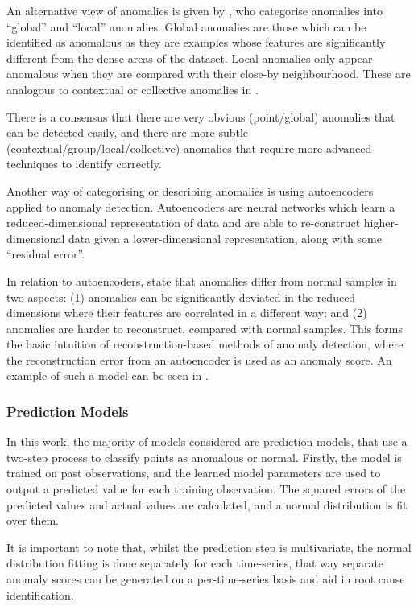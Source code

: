 \documentclass{mpaper}
\begin{document}
An alternative view of anomalies is given by \cite{comparativeUnsupervisedEvaluation}, who categorise anomalies into ``global'' and ``local'' anomalies. Global anomalies are those which can be identified as anomalous as they are examples whose features are significantly different from the dense areas of the dataset.
Local anomalies only appear anomalous when they are compared with their close-by neighbourhood. These are analogous to contextual or collective anomalies in \cite{deepLearningSurvey}.

There is a consensus that there are very obvious (point/global) anomalies that can be detected easily, and there are more subtle (contextual/group/local/collective) anomalies that require more advanced techniques to identify correctly.

Another way of categorising or describing anomalies is using autoencoders applied to anomaly detection. Autoencoders are neural networks which learn a reduced-dimensional representation of data and are able to re-construct higher-dimensional data given a lower-dimensional representation, along with some ``residual error''.

In relation to autoencoders, \cite{DAGMM} state that anomalies differ from normal samples in two aspects: (1) anomalies can be significantly deviated in the reduced dimensions where their features are correlated in a different way; and (2) anomalies are harder to reconstruct, compared with normal samples. This forms the basic intuition of reconstruction-based methods of anomaly detection, where the reconstruction error from an autoencoder is used as an anomaly score. An example of such a model can be seen in \cite{lstmEncoderDecorder}.

\subsubsection{Prediction Models}
\label{section:prediction-models}

In this work, the majority of models considered are prediction models, that use a two-step process to classify points as anomalous or normal. Firstly, the model is trained on past observations, and the learned model parameters are used to output a predicted value for each training observation. The squared errors of the predicted values and actual values are calculated, and a normal distribution is fit over them.

It is important to note that, whilst the prediction step is multivariate, the normal distribution fitting is done separately for each time-series, that way separate anomaly scores can be generated on a per-time-series basis and aid in root cause identification.
\end{document}
